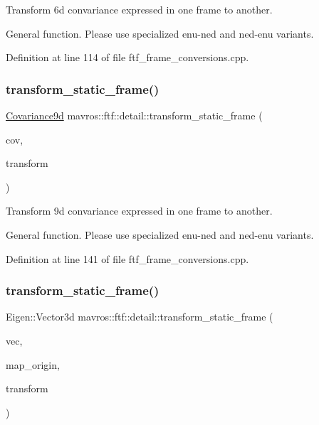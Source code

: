 Transform 6d convariance expressed in one frame to another. 

General function. Please use specialized enu-\/ned and ned-\/enu variants. 

Definition at line 114 of file ftf\+\_\+frame\+\_\+conversions.\+cpp.

\mbox{\label{group__nodelib_gacfea1c0d9ca98b288f6b8f2d17bc4fc0}} 
\subsubsection{\texorpdfstring{transform\_static\_frame()}{transform\_static\_frame()}\hspace{0.1cm}{\footnotesize\ttfamily [4/5]}}
{\footnotesize\ttfamily \mbox{\hyperlink{group__nodelib_ga6df3c37d3cd74b3e6919e734575bb9b7}{Covariance9d}} mavros\+::ftf\+::detail\+::transform\+\_\+static\+\_\+frame (\begin{DoxyParamCaption}\item[{const \mbox{\hyperlink{group__nodelib_ga6df3c37d3cd74b3e6919e734575bb9b7}{Covariance9d}} \&}]{cov,  }\item[{const \mbox{\hyperlink{group__nodelib_gacff0983128574bbbe115917b13e57a63}{Static\+TF}}}]{transform }\end{DoxyParamCaption})}



Transform 9d convariance expressed in one frame to another. 

General function. Please use specialized enu-\/ned and ned-\/enu variants. 

Definition at line 141 of file ftf\+\_\+frame\+\_\+conversions.\+cpp.

\mbox{\label{group__nodelib_ga3907cb8493e1b0c7ae33dbc1e8185a88}} 
\subsubsection{\texorpdfstring{transform\_static\_frame()}{transform\_static\_frame()}\hspace{0.1cm}{\footnotesize\ttfamily [5/5]}}
{\footnotesize\ttfamily Eigen\+::\+Vector3d mavros\+::ftf\+::detail\+::transform\+\_\+static\+\_\+frame (\begin{DoxyParamCaption}\item[{const Eigen\+::\+Vector3d \&}]{vec,  }\item[{const Eigen\+::\+Vector3d \&}]{map\+\_\+origin,  }\item[{const \mbox{\hyperlink{group__nodelib_gacff0983128574bbbe115917b13e57a63}{Static\+TF}}}]{transform }\end{DoxyParamCaption})}



